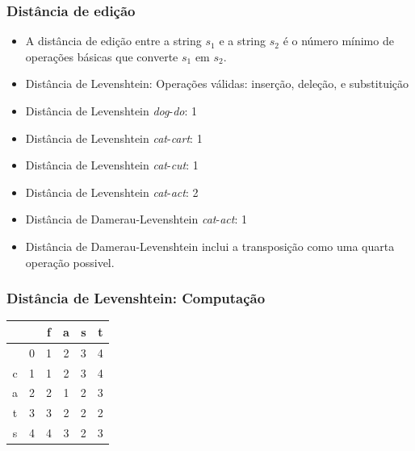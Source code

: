 \documentclass[compress]{beamer}
\begin{document}
\begin{frame}[<+->]
\frametitle{Distância de edição}
\pause[2]
\begin{itemize}
\item A distância de edição entre a string $s_1$ e a string $s_2$ é o número 
mínimo de operações básicas que converte $s_1$ em
$s_2$.
\item Distância de Levenshtein: Operações válidas: inserção, deleção, e
substituição
\item Distância de Levenshtein \emph{dog}-\emph{do}: 1
\item Distância de Levenshtein \emph{cat}-\emph{cart}: 1
\item Distância de Levenshtein \emph{cat}-\emph{cut}: 1
\item Distância de Levenshtein \emph{cat}-\emph{act}: 2
\item Distância de Damerau-Levenshtein \emph{cat}-\emph{act}: 1
\item Distância de Damerau-Levenshtein inclui a transposição como uma quarta 
operação possivel.
\end{itemize}
\end{frame}


\begin{frame}
\frametitle{Distância de Levenshtein: Computação}

\bigskip

\begin{tabular}{ ||c ||c ||c ||c ||c ||c ||}\hline\hline
& & f & a & s & t \\\hline\hline
& 

 0& 1&2&3&4\\\hline\hline
c & 1&1&2&3&4\\\hline\hline
a & 2&2&1&2&3\\\hline\hline
t & 3&3&2&2&2\\\hline\hline
s & 4&4&3&2&3\\\hline\hline
\end{tabular}

\end{frame}
\end{document}
